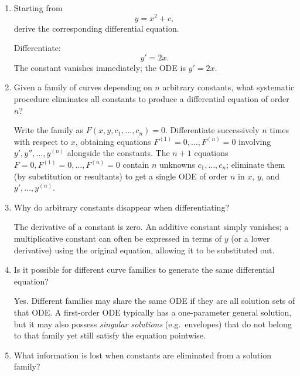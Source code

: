 \documentclass{self-check}
\begin{document}
\begin{enumerate}[leftmargin=*, itemsep=8pt]
    \begin{answer}
      Differentiate:
      \[ y' = ce^{x}. \]
      But \(ce^{x} = y\), so the ODE is \(y' = y\).
    \end{answer}
  \item Starting from
    \[ y=x^{2}+c, \]
    derive the corresponding differential equation.

    \begin{answer}
      Differentiate:
      \[ y' = 2x. \]
      The constant vanishes immediately; the ODE is \(y'=2x\).
    \end{answer}
  \item Given a family of curves depending on \(n\) arbitrary constants, what systematic procedure eliminates all constants to produce a differential equation of order~\(n\)?

    \begin{answer}
      Write the family as \(F(x,y,c_{1},\ldots,c_{n})=0\). Differentiate successively \(n\) times with respect to \(x\), obtaining equations \(F^{(1)}=0,\ldots,F^{(n)}=0\) involving \(y',y'',\ldots,y^{(n)}\) alongside the constants. The \(n+1\) equations \(F=0,F^{(1)}=0,\ldots,F^{(n)}=0\) contain \(n\) unknowns \(c_{1},\ldots,c_{n}\); eliminate them (by substitution or resultants) to get a single ODE of order \(n\) in \(x\), \(y\), and \(y',\ldots,y^{(n)}\).
    \end{answer}
  \item Why do arbitrary constants disappear when differentiating?

    \begin{answer}
      The derivative of a constant is zero. An additive constant simply vanishes; a multiplicative constant can often be expressed in terms of \(y\) (or a lower derivative) using the original equation, allowing it to be substituted out.
    \end{answer}
  \item Is it possible for different curve families to generate the same differential equation?

    \begin{answer}
      Yes. Different families may share the same ODE if they are all solution sets of that ODE. A first-order ODE typically has a one-parameter general solution, but it may also possess \emph{singular solutions} (e.g.\ envelopes) that do not belong to that family yet still satisfy the equation pointwise.
    \end{answer}
  \item What information is lost when constants are eliminated from a solution family?


\end{enumerate}
\end{document}
